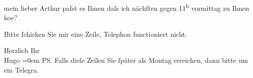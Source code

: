 \pstart{}mein lieber Arthur\pend\vspace{0.5em}
\pstart
           paſst es Ihnen daſs ich nächſten \label{K_L02347-1v}\label{K_L02347-1} gegen 11\textsuperscript{h} vormittag zu Ihnen ko{\geminationm}e?\pend
           
\pstart
           Bitte{ }ſchicken Sie mir eine Zeile, Telephon functioniert nicht.\pend
           
\pstart
           Herzlich Ihr{\\[\baselineskip]}\spacefill\mbox{Hugo}\pend
           \leftskip=0em{}
\pstart
           {\pb}\textsc{PS}. Falls dieſe Zeilen Sie{ }ſpäter als Montag erreichen,
               dann bitte um ein Telegra{\geminationm}.\pend
           \endnumbering{}  \newcommand{\dateiname}{L02347}\newcommand{\titel}{Hugo Hofmannsthal an Arthur Schnitzler, 10. 7. 1920}\newcommand{\editorInnen}{Martin Anton Müller und Gerd-Hermann Susen}
